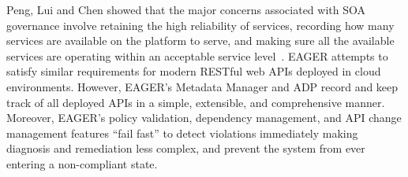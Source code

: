 Peng, Lui and Chen showed that
the major concerns associated with SOA governance 
involve retaining the high reliability of services, recording how many services
are available on the platform to serve, and making sure all the available 
services are operating within an acceptable service
level~\cite{4730489}. EAGER attempts to satisfy similar requirements for 
modern RESTful web APIs deployed in cloud environments. 
However, EAGER's Metadata Manager and ADP record and keep track of all deployed APIs 
in a simple, extensible, and comprehensive manner.  Moreover, EAGER's policy
validation, dependency management, and API change management features 
``fail fast'' to detect violations immediately making
diagnosis and remediation less complex, and prevent
the system from ever entering a non-compliant state.
